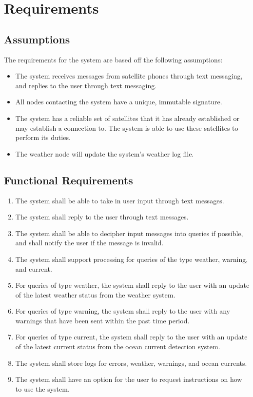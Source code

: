 \documentclass{article}
\begin{document}
\section {Requirements}
\subsection{Assumptions}
The requirements for the system are based off the following assumptions:
\begin{itemize}
    \item The system receives messages from satellite phones through text messaging, and replies to the user through text messaging.
    \item All nodes contacting the system have a unique, immutable signature.
    \item The system has a reliable set of satellites that it has already established or may establish a connection to. The system is able to use these satellites to perform its duties.
    \item The weather node will update the system's weather log file.
\end{itemize}

\subsection{Functional Requirements}
\begin{enumerate}
    \item The system shall be able to take in user input through text messages.
    \item The system shall reply to the user through text messages.
    \item The system shall be able to decipher input messages into queries if possible, and shall notify the user if the message is invalid.
    \item The system shall support processing for queries of the type weather, warning, and current.
    \item For queries of type weather, the system shall reply to the user with an update of the latest weather status from the weather system.
    \item For queries of type warning, the system shall reply to the user with any warnings that have been sent within the past time period.
    \item For queries of type current, the system shall reply to the user with an update of the latest current status from the ocean current detection system.
    \item The system shall store logs for errors, weather, warnings, and ocean currents.
    \item The system shall have an option for the user to request instructions on how to use the system.
\end{enumerate}
\end{document}
